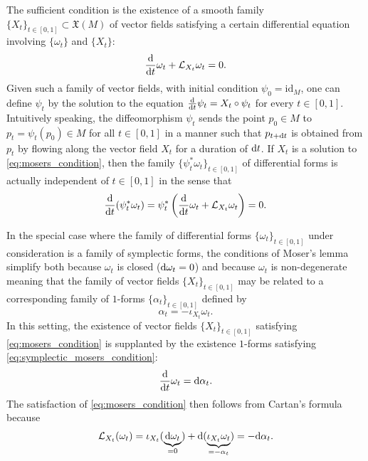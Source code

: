 \documentclass[notitlepage]{article}
\begin{document}
The sufficient condition is the existence of a smooth family $\{X_t\}_{t \in [0,1]} \subset \mathfrak{X}(M)$ of vector fields satisfying a certain differential equation involving $\{\omega_t\}$ and $\{X_t\}$:
\begin{equation}
    \label{eq:mosers_condition}
    \frac{\mathrm{d}}{\mathrm{d} t} \omega_t + \mathcal L_{X_t} \omega_t = 0.
\end{equation}
Given such a family of vector fields, with initial condition $\psi_0 = \mathrm{id}_M$, one can define $\psi_t$ by the solution to the equation $\frac{\mathrm{d}}{\mathrm{d} t}\psi_t = X_t \circ \psi_t$ for every $t \in [0,1]$.
Intuitively speaking, the diffeomorphism $\psi_{t}$ sends the point $p_0 \in M$ to $p_t = \psi_{t}(p_0) \in M$ for all $t \in [0,1]$ in a manner such that $p_{t+\mathrm{d} t}$ is obtained from $p_{t}$ by flowing along the vector field $X_t$ for a duration of $\mathrm{d} t$.
If $X_t$ is a solution to \cref{eq:mosers_condition}, then the family $\{\psi_t^{*}\omega_{t}\}_{t \in [0,1]}$ of differential forms is actually independent of $t \in [0,1]$ in the sense that
\begin{equation}
    \frac{\mathrm{d}}{\mathrm{d} t} (\psi_t^{*}\omega_t) = \psi_t^{*} \left(\frac{\mathrm{d}}{\mathrm{d} t}\omega_t + \mathcal L_{X_t} \omega_t \right) = 0.
\end{equation}

In the special case where the family of differential forms $\{\omega_t\}_{t\in[0,1]}$ under consideration is a family of symplectic forms, the conditions of Moser's lemma simplify both because $\omega_t$ is closed ($\mathrm{d} \omega_t = 0$) and because $\omega_t$ is non-degenerate meaning that the family of vector fields $\{X_t\}_{t \in [0,1]}$ may be related to a corresponding family of $1$-forms $\{\alpha_t\}_{t \in [0,1]}$ defined by 
\begin{equation}
    \alpha_t = -\iota_{X_t}\omega_t.
\end{equation}
In this setting, the existence of vector fields $\{X_t\}_{t \in [0,1]}$ satisfying \cref{eq:mosers_condition} is supplanted by the existence $1$-forms satisfying \cref{eq:symplectic_mosers_condition}:
\begin{equation}
    \label{eq:symplectic_mosers_condition}
    \frac{\mathrm{d}}{\mathrm{d} t} \omega_t = \mathrm{d} \alpha_t.
\end{equation}
The satisfaction of \cref{eq:mosers_condition} then follows from Cartan's formula because
\begin{align}
    \mathcal L_{X_t}(\omega_t) 
    = \iota_{X_t} (\underbrace{\mathrm{d} \omega_t}_{=0}) + \mathrm{d} (\underbrace{\iota_{X_t} \omega_t}_{=-\alpha_t})
    = -\mathrm{d} \alpha_t.
\end{align}
\end{document}
